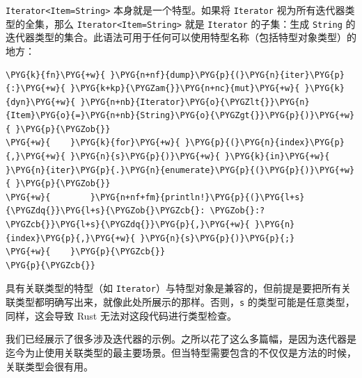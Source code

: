 \texttt{Iterator<Item=String>} 本身就是一个特型。如果将 \texttt{Iterator} 视为所有迭代器类型的全集，那么 \texttt{Iterator<Item=String>} 就是 \texttt{Iterator} 的子集：生成 \texttt{String} 的迭代器类型的集合。此语法可用于任何可以使用特型名称（包括特型对象类型）的地方：

\begin{Verbatim}[commandchars=\\\{\},breaklines=true,breakanywhere=true,fontsize=\codefont,xleftmargin=17bp]
\PYG{k}{fn}\PYG{+w}{ }\PYG{n+nf}{dump}\PYG{p}{(}\PYG{n}{iter}\PYG{p}{:}\PYG{+w}{ }\PYG{k+kp}{\PYGZam{}}\PYG{n+nc}{mut}\PYG{+w}{ }\PYG{k}{dyn}\PYG{+w}{ }\PYG{n+nb}{Iterator}\PYG{o}{\PYGZlt{}}\PYG{n}{Item}\PYG{o}{=}\PYG{n+nb}{String}\PYG{o}{\PYGZgt{}}\PYG{p}{)}\PYG{+w}{ }\PYG{p}{\PYGZob{}}
\PYG{+w}{    }\PYG{k}{for}\PYG{+w}{ }\PYG{p}{(}\PYG{n}{index}\PYG{p}{,}\PYG{+w}{ }\PYG{n}{s}\PYG{p}{)}\PYG{+w}{ }\PYG{k}{in}\PYG{+w}{ }\PYG{n}{iter}\PYG{p}{.}\PYG{n}{enumerate}\PYG{p}{(}\PYG{p}{)}\PYG{+w}{ }\PYG{p}{\PYGZob{}}
\PYG{+w}{        }\PYG{n+nf+fm}{println!}\PYG{p}{(}\PYG{l+s}{\PYGZdq{}}\PYG{l+s}{\PYGZob{}\PYGZcb{}: \PYGZob{}:?\PYGZcb{}}\PYG{l+s}{\PYGZdq{}}\PYG{p}{,}\PYG{+w}{ }\PYG{n}{index}\PYG{p}{,}\PYG{+w}{ }\PYG{n}{s}\PYG{p}{)}\PYG{p}{;}
\PYG{+w}{    }\PYG{p}{\PYGZcb{}}
\PYG{p}{\PYGZcb{}}
\end{Verbatim}

具有关联类型的特型（如 \texttt{Iterator}）与特型对象是兼容的，但前提是要把所有关联类型都明确写出来，就像此处所展示的那样。否则，\texttt{s} 的类型可能是任意类型，同样，这会导致 Rust 无法对这段代码进行类型检查。

我们已经展示了很多涉及迭代器的示例。之所以花了这么多篇幅，是因为迭代器是迄今为止使用关联类型的最主要场景。但当特型需要包含的不仅仅是方法的时候，关联类型会很有用。

